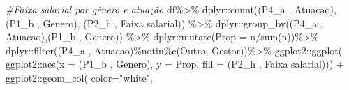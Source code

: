 \documentclass[
]{article}
\newenvironment{Shaded}{\begin{snugshade}}{\end{snugshade}}
\newcommand{\AttributeTok}[1]{\textcolor[rgb]{0.77,0.63,0.00}{#1}}
\newcommand{\CommentTok}[1]{\textcolor[rgb]{0.56,0.35,0.01}{\textit{#1}}}
\newcommand{\FunctionTok}[1]{\textcolor[rgb]{0.00,0.00,0.00}{#1}}
\newcommand{\NormalTok}[1]{#1}
\newcommand{\SpecialCharTok}[1]{\textcolor[rgb]{0.00,0.00,0.00}{#1}}
\newcommand{\StringTok}[1]{\textcolor[rgb]{0.31,0.60,0.02}{#1}}
\begin{document}
\begin{Shaded}
\begin{Highlighting}[]
\CommentTok{\#Faixa salarial por gênero e atuação}
\NormalTok{df}\SpecialCharTok{\%\textgreater{}\%}
\NormalTok{  dplyr}\SpecialCharTok{::}\FunctionTok{count}\NormalTok{(}\StringTok{\textasciigrave{}}\AttributeTok{(\textquotesingle{}P4\_a \textquotesingle{}, \textquotesingle{}Atuacao\textquotesingle{})}\StringTok{\textasciigrave{}}\NormalTok{,}\StringTok{\textasciigrave{}}\AttributeTok{(\textquotesingle{}P1\_b \textquotesingle{}, \textquotesingle{}Genero\textquotesingle{})}\StringTok{\textasciigrave{}}\NormalTok{, }\StringTok{\textasciigrave{}}\AttributeTok{(\textquotesingle{}P2\_h \textquotesingle{}, \textquotesingle{}Faixa salarial\textquotesingle{})}\StringTok{\textasciigrave{}}\NormalTok{) }\SpecialCharTok{\%\textgreater{}\%}
\NormalTok{  dplyr}\SpecialCharTok{::}\FunctionTok{group\_by}\NormalTok{(}\StringTok{\textasciigrave{}}\AttributeTok{(\textquotesingle{}P4\_a \textquotesingle{}, \textquotesingle{}Atuacao\textquotesingle{})}\StringTok{\textasciigrave{}}\NormalTok{,}\StringTok{\textasciigrave{}}\AttributeTok{(\textquotesingle{}P1\_b \textquotesingle{}, \textquotesingle{}Genero\textquotesingle{})}\StringTok{\textasciigrave{}}\NormalTok{) }\SpecialCharTok{\%\textgreater{}\%}
\NormalTok{  dplyr}\SpecialCharTok{::}\FunctionTok{mutate}\NormalTok{(}\AttributeTok{Prop =}\NormalTok{ n}\SpecialCharTok{/}\FunctionTok{sum}\NormalTok{(n))}\SpecialCharTok{\%\textgreater{}\%}
\NormalTok{  dplyr}\SpecialCharTok{::}\FunctionTok{filter}\NormalTok{(}\StringTok{\textasciigrave{}}\AttributeTok{(\textquotesingle{}P4\_a \textquotesingle{}, \textquotesingle{}Atuacao\textquotesingle{})}\StringTok{\textasciigrave{}}\SpecialCharTok{\%notin\%}\FunctionTok{c}\NormalTok{(}\StringTok{\textquotesingle{}Outra\textquotesingle{}}\NormalTok{, }\StringTok{\textquotesingle{}Gestor\textquotesingle{}}\NormalTok{))}\SpecialCharTok{\%\textgreater{}\%}
\NormalTok{  ggplot2}\SpecialCharTok{::}\FunctionTok{ggplot}\NormalTok{(}
\NormalTok{    ggplot2}\SpecialCharTok{::}\FunctionTok{aes}\NormalTok{(}\AttributeTok{x =} \StringTok{\textasciigrave{}}\AttributeTok{(\textquotesingle{}P1\_b \textquotesingle{}, \textquotesingle{}Genero\textquotesingle{})}\StringTok{\textasciigrave{}}\NormalTok{, }\AttributeTok{y =}\NormalTok{ Prop,}
                 \AttributeTok{fill =} \StringTok{\textasciigrave{}}\AttributeTok{(\textquotesingle{}P2\_h \textquotesingle{}, \textquotesingle{}Faixa salarial\textquotesingle{})}\StringTok{\textasciigrave{}}\NormalTok{)) }\SpecialCharTok{+}
\NormalTok{  ggplot2}\SpecialCharTok{::}\FunctionTok{geom\_col}\NormalTok{( }\AttributeTok{color=}\StringTok{"white"}\NormalTok{,}

\end{Highlighting}
\end{Shaded}
\end{document}
